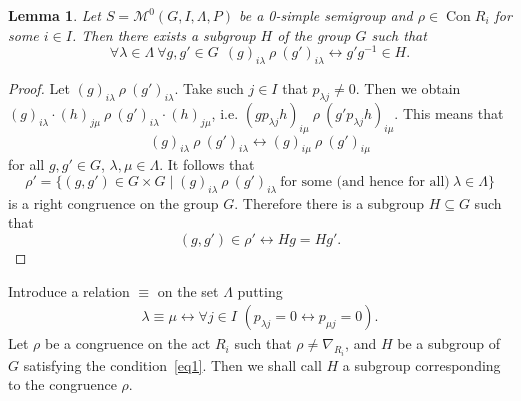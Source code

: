 \documentclass{birkau}
\numberwithin{equation}{section}
\theoremstyle{plain}
\newtheorem{lemma}[theorem]{Lemma}
\theoremstyle{definition}
\DeclareMathOperator{\Con}{Con}
\begin{document}
	\begin{lemma} \label{lemma:B}
	    Let $S=\mathcal{M}^0(G,I,\Lambda,P)$ be a 0-simple semigroup and $\rho \in \Con R_i$ for some $i \in I$. Then there exists a subgroup $H$ of the group $G$ such that
	    \begin{equation} \label{eq1}
	        \forall \lambda \in \Lambda \ \forall g,g' \in G \ \ (g)_{i\lambda} \ \rho \ (g')_{i \lambda} \leftrightarrow g'g^{-1} \in H.
	    \end{equation}
	\end{lemma}
	\begin{proof}
	    Let $(g)_{i \lambda} \ \rho \ (g')_{i \lambda}$. Take such $j \in I$ that $p_{\lambda j} \neq 0$. Then we obtain $(g)_{i \lambda} \cdot (h)_{j \mu} \ \rho \ (g')_{i \lambda} \cdot (h)_{j \mu}$, i.e. $(gp_{\lambda j}h)_{i \mu} \ \rho \ (g' p_{\lambda j} h)_{i \mu}$. This means that $$ (g)_{i \lambda} \ \rho \ (g')_{i \lambda} \leftrightarrow(g)_{i \mu} \ \rho \ (g')_{i \mu} $$ for all $g, g' \in G$, $\lambda, \mu \in \Lambda$. It follows that $$ \rho' = \{ (g,g') \in G \times G \mid (g)_{i \lambda} \ \rho \ (g')_{i \lambda} \ \text{for some (and hence for all)} \ \lambda \in \Lambda \} $$ is a right congruence on the group $G$. Therefore there is a subgroup $H \subseteq G$ such that $$ (g,g') \in \rho' \leftrightarrow Hg = Hg'. $$
	\end{proof}
	
	Introduce a relation $\equiv$ on the set $\Lambda$ putting
	\begin{gather}
	    \lambda \equiv \mu \leftrightarrow \forall j\in I \,\,(p_{\lambda j} =0 \leftrightarrow p_{\mu j}=0). \label{eq821}
	\end{gather}
	Let $\rho$ be a congruence on the act $R_i$ such that $\rho \ne \nabla_{R_i}$, and $H$ be a subgroup of $G$ satisfying the condition~\eqref{eq1}. Then we shall call $H$ a subgroup corresponding to the congruence $\rho$.
\end{document}
